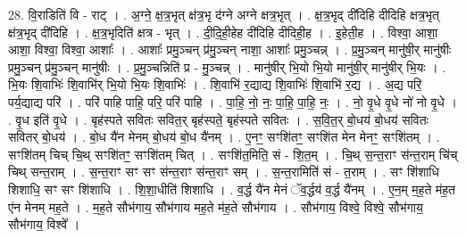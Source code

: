 \documentclass[17pt]{extarticle}
\begin{document}
28. वि॒राडिति॑ वि - राट् । . अ॒ग्ने॒ क्ष॒त्र॒भृत् क्ष॑त्र॒भृ द॑ग्ने अग्ने क्षत्र॒भृत् । . क्ष॒त्र॒भृद् दी॑दिहि दीदिहि क्षत्र॒भृत् क्ष॑त्र॒भृद् दी॑दिहि । . क्ष॒त्र॒भृदिति॑ क्षत्र - भृत् । . दी॒दि॒ही॒हेह दी॑दिहि दीदिही॒ह । . इ॒हेती॒ह । . विश्वा॒ आशा॒ आशा॒ विश्वा॒ विश्वा॒ आशाः᳚ । . आशाः᳚ प्रमु॒ञ्चन् प्र॑मु॒ञ्चन् नाशा॒ आशाः᳚ प्रमु॒ञ्चन्न् । . प्र॒मु॒ञ्चन् मानु॑षी॒र् मानु॑षीः प्रमु॒ञ्चन् प्र॑मु॒ञ्चन् मानु॑षीः । . प्र॒मु॒ञ्चन्निति॑ प्र - मु॒ञ्चन्न् । . मानु॑षीर् भि॒यो भि॒यो मानु॑षी॒र् मानु॑षीर् भि॒यः । . भि॒यः शि॒वाभिः॑ शि॒वाभि॑र् भि॒यो भि॒यः शि॒वाभिः॑ । . शि॒वाभि॑ र॒द्याद्य शि॒वाभिः॑ शि॒वाभि॑ र॒द्य । . अ॒द्य परि॒ पर्य॒द्याद्य परि॑ । . परि॑ पाहि पाहि॒ परि॒ परि॑ पाहि । . पा॒हि॒ नो॒ नः॒ पा॒हि॒ पा॒हि॒ नः॒ । . नो॒ वृ॒धे वृ॒धे नो॑ नो वृ॒धे । . वृ॒ध इति॑ वृ॒धे । . बृह॑स्पते सवितः सवित॒र् बृह॑स्पते॒ बृह॑स्पते सवितः । . स॒वि॒त॒र् बो॒धय॑ बो॒धय॑ सवितः सवितर् बो॒धय॑ । . बो॒ध यै॑न मेनम् बो॒धय॑ बो॒ध यै॑नम् । . ए॒नꣳ॒॒ सꣳशि॑तꣳ॒॒ सꣳशि॑त मेन मेनꣳ॒॒ सꣳशि॑तम् । . सꣳशि॑तम् चिच् चि॒थ् सꣳशि॑तꣳ॒॒ सꣳशि॑तम् चित् । . सꣳशि॑त॒मिति॒ सं - शि॒त॒म् । . चि॒थ् स॒न्त॒राꣳ स॑न्त॒राम् चि॑च् चिथ् सन्त॒राम् । . स॒न्त॒राꣳ सꣳ सꣳ स॑न्त॒राꣳ स॑न्त॒राꣳ सम् । . स॒न्त॒रामिति॑ सं - त॒राम् । . सꣳ शि॑शाधि शिशाधि॒ सꣳ सꣳ शि॑शाधि । . शि॒शा॒धीति॑ शिशाधि । . व॒र्द्ध यै॑न मेनं ॅव॒र्द्धय॑ व॒र्द्ध यै॑नम् । . ए॒न॒म् म॒ह॒ते म॑ह॒त ए॑न मेनम् मह॒ते । . म॒ह॒ते सौभ॑गाय॒ सौभ॑गाय मह॒ते म॑ह॒ते सौभ॑गाय । . सौभ॑गाय॒ विश्वे॒ विश्वे॒ सौभ॑गाय॒ सौभ॑गाय॒ विश्वे᳚ । \newline
\end{document}
